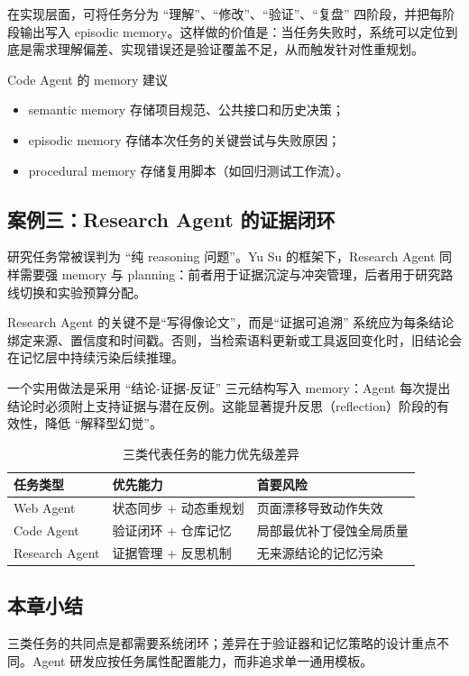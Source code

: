 在实现层面，可将任务分为 ``理解''、``修改''、``验证''、``复盘'' 四阶段，并把每阶段输出写入 episodic memory。这样做的价值是：当任务失败时，系统可以定位到底是需求理解偏差、实现错误还是验证覆盖不足，从而触发针对性重规划。

\begin{knowledgebox}{Code Agent 的 memory 建议}
\begin{itemize}
    \item semantic memory 存储项目规范、公共接口和历史决策；
    \item episodic memory 存储本次任务的关键尝试与失败原因；
    \item procedural memory 存储复用脚本（如回归测试工作流）。
\end{itemize}
\end{knowledgebox}

\subsection{案例三：Research Agent 的证据闭环}
研究任务常被误判为 ``纯 reasoning 问题''。Yu Su 的框架下，Research Agent 同样需要强 memory 与 planning：前者用于证据沉淀与冲突管理，后者用于研究路线切换和实验预算分配。

\begin{importantbox}{Research Agent 的关键不是“写得像论文”，而是“证据可追溯”}
系统应为每条结论绑定来源、置信度和时间戳。否则，当检索语料更新或工具返回变化时，旧结论会在记忆层中持续污染后续推理。
\end{importantbox}

一个实用做法是采用 ``结论-证据-反证'' 三元结构写入 memory：Agent 每次提出结论时必须附上支持证据与潜在反例。这能显著提升反思（reflection）阶段的有效性，降低 ``解释型幻觉''。

\begin{table}[H]
\centering
\begin{tabular}{p{2.7cm}p{3.9cm}p{4.4cm}}
\toprule
\textbf{任务类型} & \textbf{优先能力} & \textbf{首要风险} \\
\midrule
Web Agent & 状态同步 + 动态重规划 & 页面漂移导致动作失效 \\
Code Agent & 验证闭环 + 仓库记忆 & 局部最优补丁侵蚀全局质量 \\
Research Agent & 证据管理 + 反思机制 & 无来源结论的记忆污染 \\
\bottomrule
\end{tabular}
\caption{三类代表任务的能力优先级差异}
\end{table}

\subsection{本章小结}
三类任务的共同点是都需要系统闭环；差异在于验证器和记忆策略的设计重点不同。Agent 研发应按任务属性配置能力，而非追求单一通用模板。

